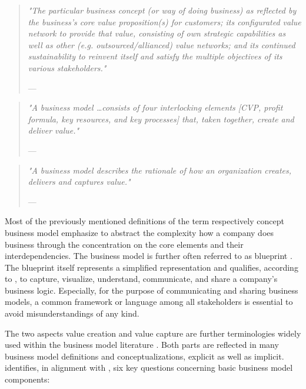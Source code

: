 \begin{quote}{\slshape 
"The particular business concept (or way of doing business) as reflected by the business's core value proposition(s) for customers; its configurated value network to provide that value, consisting of own strategic capabilities as well as other (e.g. outsourced/allianced) value networks; and its continued sustainability to reinvent itself and satisfy the multiple objectives of its various stakeholders."}
\vspace*{-7pt}
\begin{flushright}
	--- \citet[p. 40]{Voelpel2005}
\end{flushright}
\end{quote}

\begin{quote}{\slshape 
"A business model \ldots consists of four interlocking elements [\ac{CVP}, profit formula, key resources, and key processes] that, taken together, create and deliver value."}
\vspace*{-7pt}
\begin{flushright}
	--- \citet[p. 52]{Johnson2008}
\end{flushright}
\end{quote}

\begin{quote}{\slshape 
"A business model describes the rationale of how an organization creates, delivers and captures value."}
\vspace*{-7pt}
\begin{flushright}
	--- \citet[p. 14]{Osterwalder2010}
\end{flushright}
\end{quote}

Most of the previously mentioned definitions of the term respectively concept business model emphasize to abstract the complexity how a company does business through the concentration on the core elements and their interdependencies. The business model is further often referred to as blueprint . The blueprint itself represents a simplified representation and qualifies, according to \citet[pp. 11-14]{Osterwalder2005}, to capture, visualize, understand, communicate, and share a company's business logic. Especially, for the purpose of communicating and sharing business models, a common framework or language among all stakeholders is essential to avoid misunderstandings of any kind.

The two aspects value creation and value capture are further terminologies widely used within the business model literature . Both parts are reflected in many business model definitions and conceptualizations, explicit as well as implicit. \citet[pp. 729-732]{Morris2005} identifies, in alignment with \citet[pp. 49-61]{Drucker1954}, six key questions concerning basic business model components:

